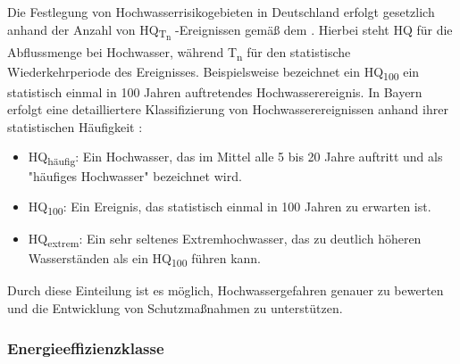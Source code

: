 Die Festlegung von Hochwasserrisikogebieten in Deutschland erfolgt gesetzlich anhand der Anzahl von HQ\textsubscript{T\textsubscript{n} }-Ereignissen gemäß dem \textcite{WHG73}. Hierbei steht HQ für die Abflussmenge bei Hochwasser, während T\textsubscript{n} für den statistische Wiederkehrperiode des Ereignisses. Beispielsweise bezeichnet ein HQ\textsubscript{100} ein statistisch einmal in 100 Jahren auftretendes Hochwasserereignis.
In Bayern erfolgt eine detailliertere Klassifizierung von Hochwasserereignissen anhand ihrer statistischen Häufigkeit \autocite{BayLfU2019}:
\begin{itemize}
\item HQ\textsubscript{häufig}: Ein Hochwasser, das im Mittel alle 5 bis 20 Jahre auftritt und als "häufiges Hochwasser" bezeichnet wird.
\item HQ\textsubscript{100}: Ein Ereignis, das statistisch einmal in 100 Jahren zu erwarten ist.
\item HQ\textsubscript{extrem}: Ein sehr seltenes Extremhochwasser, das zu deutlich höheren Wasserständen als ein HQ\textsubscript{100} führen kann.
\end{itemize}
Durch diese Einteilung ist es möglich, Hochwassergefahren genauer zu bewerten und die Entwicklung von Schutzmaßnahmen zu unterstützen.

\subsubsection{Energieeffizienzklasse}

